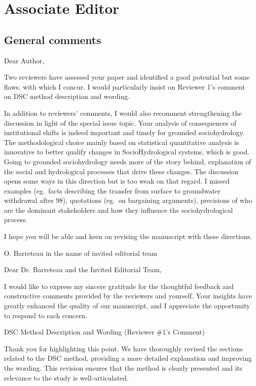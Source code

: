 \section*{Associate Editor}\label{editor}

\subsection*{General comments}
\RC{} Dear Author,

\RC*{} Two reviewers have assessed your paper and identified a good potential but some flaws, with which I concur. I would particularly insist on Reviewer 1's comment on DSC method description and wording.

\RC*{} In addition to reviewers' comments, I would also recomment strengthening the discussion in light of the special issue topic. Your analysis of consequences of institutional shifts is indeed important and timely for grounded sociohydrology. The methodological choice mainly based on statistical quantitative analysis is innovative to better qualify changes in SocioHydrological systems, which is good. Going to grounded sociohydrology needs more of the story behind, explanation of the social and hydrological processes that drive these changes. The discussion opens some ways in this direction but is too weak on that regard. I missed examples (eg.\ facts describing the transfer from surface to groundwater withdrawal after 98), quotations (eg.\ on bargaining arguments), precisions of who are the dominant stakeholders and how they influence the sociohydrological process.

\RC*{} I hope you will be able and keen on revising the manuscript with these directions.

\RC*{} O. Barreteau in the name of invited editorial team

\AR{} Dear Dr. Barreteau and the Invited Editorial Team,

\AR*{} I would like to express my sincere gratitude for the thoughtful feedback and constructive comments provided by the reviewers and yourself. Your insights have greatly enhanced the quality of our manuscript, and I appreciate the opportunity to respond to each concern.

\AR{} DSC Method Description and Wording (Reviewer \#1's Comment)

\AR*{} Thank you for highlighting this point. We have thoroughly revised the sections related to the DSC method, providing a more detailed explanation and improving the wording. This revision ensures that the method is clearly presented and its relevance to the study is well-articulated.


